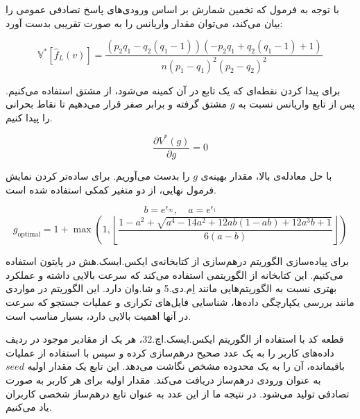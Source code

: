 با توجه به فرمول  که تخمین شمارش بر اساس ورودی‌های پاسخ تصادفی عمومی را بیان می‌کند، می‌توان مقدار واریانس را به صورت تقریبی بدست آورد:

\begin{equation}
\mathbb{V}^*[\hat{f}_L(v)] = \frac{(p_2q_1 - q_2(q_1-1))(-p_2q_1 + q_2(q_1-1)+1)}{n(p_1-q_1)^2(p_2-q_2)^2}
\end{equation}

برای پیدا کردن نقطه‌ای که یک تابع در آن کمینه می‌شود، از مشتق استفاده می‌کنیم. پس از تابع واریانس نسبت به $g$ مشتق گرفته و برابر صفر قرار می‌دهیم تا نقاط بحرانی را پیدا کنیم.

$$\frac{\partial V^*(g)}{\partial g} = 0$$

با حل معادله‌ی بالا، مقدار بهینه‌ی $g$ را بدست می‌آوریم. برای ساده‌تر کردن نمایش فرمول نهایی، از دو متغیر کمکی استفاده شده است.

$$b = e^{\epsilon_\infty}, \quad a = e^{\epsilon_1}$$
\begin{equation}
g_{\text{optimal}} = 1 + \max\left(1, \left\lfloor \frac{1-a^2+\sqrt{a^4-14a^2+12ab(1-ab)+12a^3b+1}}{6(a-b)} \right\rfloor \right)
\end{equation}

برای پیاده‌سازی الگوریتم درهم‌سازی از کتابخانه‌ی ایکس.ایسک.هش  در پایتون استفاده می‌کنیم. این کتابخانه از الگوریتمی استفاده می‌کند که سرعت بالایی داشته و عملکرد بهتری نسبت به الگوریتم‌هایی مانند اِم.دی.5 و شا.وان دارد. این الگوریتم در مواردی مانند بررسی یکپارچگی داده‌ها، شناسایی فایل‌های تکراری و عملیات جستجو که سرعت در آنها اهمیت بالایی دارد، بسیار مناسب است.

قطعه کد  با استفاده از الگوریتم ایکس.ایسک.اچ.32، هر یک از مقادیر موجود در ردیف داده‌های کاربر را به یک عدد صحیح درهم‌سازی کرده و سپس با استفاده از عملیات باقیمانده، آن را به یک محدوده مشخص نگاشت می‌دهد. این تابع یک مقدار اولیه $seed$ به عنوان ورودی درهم‌ساز دریافت می‌کند. مقدار اولیه برای هر کاربر به صورت تصادفی تولید می‌شود. در نتیجه ما از این عدد به عنوان تابع درهم‌ساز شخصی کاربران یاد می‌کنیم.


